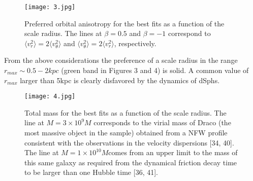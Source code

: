 \documentclass{article}
\begin{document}
\begin{figure}[h]
\centering
\texttt{[image: 3.jpg]}
\caption{\label{fig:1} Preferred  orbital  anisotropy  for  the  best  fits  as  a function of the scale radius.  The lines at $\beta= 0.5$ and $\beta=−1$ correspond to ${\langle v^2_r\rangle}= 2{\langle {v^2_\theta}\rangle}$ and ${\langle {v^2_\theta} \rangle}= 2{\langle v^2_r\rangle}$, respectively.}
\end{figure}
\begin{multicols}{2}
 From the above considerations the preference of a scale radius  in  the  range $r_{max}\sim0.5−2kpc$ (green  band  in Figures 3 and 4) is solid.  A common value of $r_{max}$ larger than 5kpc is clearly disfavored by the dynamics of dSphs.
 \end{multicols}
\begin{figure}[h]
\centering
\texttt{[image: 4.jpg]}
\caption{\label{fig:1} Total mass for the best fits as a function of the scale radius.  The line at $M= 3×10^9M$ corresponds to the virial mass of Draco (the most massive object in the sample) obtained from a NFW profile consistent with the observations in the velocity dispersions [34, 40].  The line at $M= 1×10^{10}M$comes from an upper limit to the mass of this same galaxy as required from the dynamical friction decay time to be larger than one Hubble time [36, 41].}
\end{figure}
\end{document}

